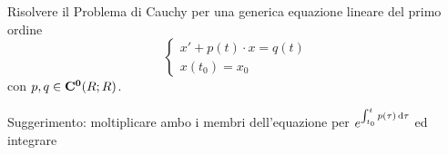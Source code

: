 \begin{exercise}
	Risolvere il Problema di Cauchy per una generica equazione lineare del primo ordine
	\begin{equation*}
	\begin{cases}
	x' + p(t) \cdot x = q(t)\\
	x(t_0) = x_0
	\end{cases}
	\end{equation*}
	con $p,q \in \mathbf{C^{0}}(R;R)$.
	\begin{solution}
		Suggerimento: moltiplicare ambo i membri dell'equazione per $e^{\int_{t_0}^{t}p(\tau)\,\mathrm{d}{\tau}}$ ed integrare
	\end{solution}
\end{exercise}
\color{black}

\color{not_explained_section_color}
